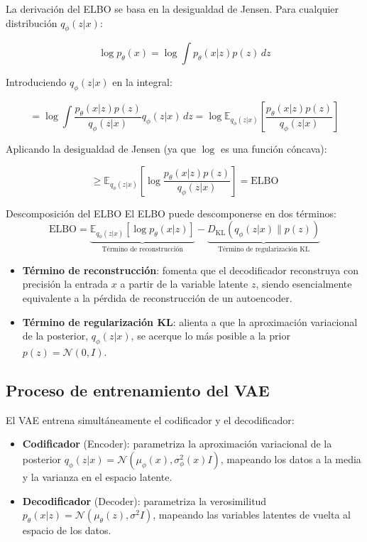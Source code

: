 \documentclass[a4paper]{article}
\begin{document}
La derivación del ELBO se basa en la desigualdad de Jensen. Para cualquier distribución $q_\phi(z|x)$:

$$\log p_\theta(x) = \log \int p_\theta(x|z) p(z) \, dz$$

Introduciendo $q_\phi(z|x)$ en la integral:

$$= \log \int \frac{p_\theta(x|z) p(z)}{q_\phi(z|x)} q_\phi(z|x) \, dz = \log \mathbb{E}_{q_\phi(z|x)} \left[ \frac{p_\theta(x|z) p(z)}{q_\phi(z|x)} \right]$$

Aplicando la desigualdad de Jensen (ya que $\log$ es una función cóncava):

$$\geq \mathbb{E}_{q_\phi(z|x)} \left[ \log \frac{p_\theta(x|z) p(z)}{q_\phi(z|x)} \right] = \text{ELBO}$$

\begin{importantbox}{Descomposición del ELBO}
El ELBO puede descomponerse en dos términos:
$$\text{ELBO} = \underbrace{\mathbb{E}_{q_\phi(z|x)}[\log p_\theta(x|z)]}_{\text{Término de reconstrucción}} - \underbrace{D_{\text{KL}}(q_\phi(z|x) \| p(z))}_{\text{Término de regularización KL}}$$

\begin{itemize}
    \item \textbf{Término de reconstrucción}: fomenta que el decodificador reconstruya con precisión la entrada $x$ a partir de la variable latente $z$, siendo esencialmente equivalente a la pérdida de reconstrucción de un autoencoder.
    \item \textbf{Término de regularización KL}: alienta a que la aproximación variacional de la posterior, $q_\phi(z|x)$, se acerque lo más posible a la prior $p(z) = \mathcal{N}(0, I)$.
\end{itemize}
\end{importantbox}

\subsection{Proceso de entrenamiento del VAE}

El VAE entrena simultáneamente el codificador y el decodificador:

\begin{itemize}
    \item \textbf{Codificador} (Encoder): parametriza la aproximación variacional de la posterior $q_\phi(z|x) = \mathcal{N}(\mu_\phi(x), \sigma^2_\phi(x) I)$, mapeando los datos a la media y la varianza en el espacio latente.
    \item \textbf{Decodificador} (Decoder): parametriza la verosimilitud $p_\theta(x|z) = \mathcal{N}(\mu_\theta(z), \sigma^2 I)$, mapeando las variables latentes de vuelta al espacio de los datos.
\end{itemize}
\end{document}
